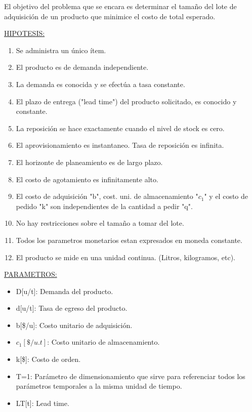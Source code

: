 \documentclass{article}
\begin{document}
El objetivo del problema que se encara es determinar el tamaño del lote de adquisición de un 
producto que minimice el costo de total esperado.

\noindent
\underline{HIPOTESIS:}
\begin{enumerate}
    \item Se administra un único ítem.
    \item El producto es de demanda independiente.
    \item La demanda es conocida y se efectúa a tasa constante.
    \item El plazo de entrega ("lead time") del producto solicitado, es conocido y constante.
    \item La reposición se hace exactamente cuando el nivel de stock es cero.
    \item El aprovisionamiento es instantaneo. Tasa de reposición es infinita.
    \item El horizonte de planeamiento es de largo plazo.
    \item El costo de agotamiento es infinitamente alto.
    \item El costo de adquisición "b", cost. uni. de almacenamiento "\(c_1\)" y el costo de pedido "k" son independientes de la cantidad a pedir "q".
    \item No hay restricciones sobre el tamaño a tomar del lote.
    \item Todos los parametros monetarios estan expresados en moneda constante.
    \item El producto se mide en una unidad continua. (Litros, kilogramos, etc).
\end{enumerate}

\noindent
\underline{PARAMETROS:}
\begin{itemize}
    \item D[u/t]: Demanda del producto.
    \item d[u/t]: Tasa de egreso del producto.
    \item b[\$/u]: Costo unitario de adquisición.
    \item \(c_1[\$/u.t]\):  Costo unitario de almacenamiento.
    \item k[\$]: Costo de orden.
    \item T=1: Parámetro de dimensionamiento que sirve para referenciar todos los parámetros temporales a la misma unidad de tiempo.
    \item LT[t]: Lead time.
\end{itemize}
\end{document}
